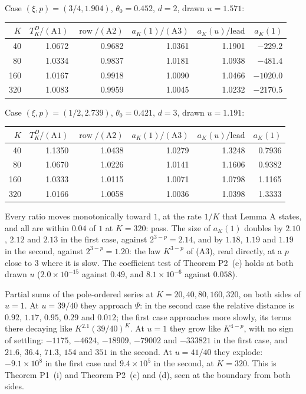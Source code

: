 \documentclass[11pt]{article}
\newcommand{\row}{\operatorname{row}}
\begin{document}
Case $(\xi,p)=(3/4,1.904)$, $\theta_0=0.452$, $d=2$, drawn $u=1.571$:
\begin{center}
\begin{tabular}{rrrrrr}
$K$ & $T^D_K/(\mathrm{A1})$ & $\row/(\mathrm{A2})$ & $a_K(1)/(\mathrm{A3})$ & $a_K(u)/\mathrm{lead}$ & $a_K(1)$\\
\hline
40 & 1.0672 & 0.9682 & 1.0361 & 1.1901 & $-229.2$\\
80 & 1.0334 & 0.9837 & 1.0181 & 1.0938 & $-481.4$\\
160 & 1.0167 & 0.9918 & 1.0090 & 1.0466 & $-1020.0$\\
320 & 1.0083 & 0.9959 & 1.0045 & 1.0232 & $-2170.5$\\
\end{tabular}
\end{center}
Case $(\xi,p)=(1/2,2.739)$, $\theta_0=0.421$, $d=3$, drawn $u=1.191$:
\begin{center}
\begin{tabular}{rrrrrr}
$K$ & $T^D_K/(\mathrm{A1})$ & $\row/(\mathrm{A2})$ & $a_K(1)/(\mathrm{A3})$ & $a_K(u)/\mathrm{lead}$ & $a_K(1)$\\
\hline
40 & 1.1350 & 1.0438 & 1.0279 & 1.3248 & 0.7936\\
80 & 1.0670 & 1.0226 & 1.0141 & 1.1606 & 0.9382\\
160 & 1.0333 & 1.0115 & 1.0071 & 1.0798 & 1.1165\\
320 & 1.0166 & 1.0058 & 1.0036 & 1.0398 & 1.3333\\
\end{tabular}
\end{center}
Every ratio moves monotonically toward $1$, at the rate $1/K$ that Lemma A states, and all are within $0.04$ of $1$ at $K=320$: pass. The size of $a_K(1)$ doubles by $2.10$, $2.12$ and $2.13$ in the first case, against $2^{3-p}=2.14$, and by $1.18$, $1.19$ and $1.19$ in the second, against $2^{3-p}=1.20$: the law $K^{3-p}$ of (A3), read directly, at a $p$ close to $3$ where it is slow. The coefficient test of Theorem P2~(e) holds at both drawn $u$ ($2.0\times10^{-15}$ against $0.49$, and $8.1\times10^{-6}$ against $0.058$).

Partial sums of the pole-ordered series at $K=20,40,80,160,320$, on both sides of $u=1$. At $u=39/40$ they approach $\Psi$: in the second case the relative distance is $0.92$, $1.17$, $0.95$, $0.29$ and $0.012$; the first case approaches more slowly, its terms there decaying like $K^{2.1}(39/40)^K$. At $u=1$ they grow like $K^{4-p}$, with no sign of settling: $-1175$, $-4624$, $-18909$, $-79002$ and $-333821$ in the first case, and $21.6$, $36.4$, $71.3$, $154$ and $351$ in the second. At $u=41/40$ they explode: $-9.1\times10^{8}$ in the first case and $9.4\times10^{5}$ in the second, at $K=320$. This is Theorem P1~(i) and Theorem P2~(c) and (d), seen at the boundary from both sides.
\end{document}
